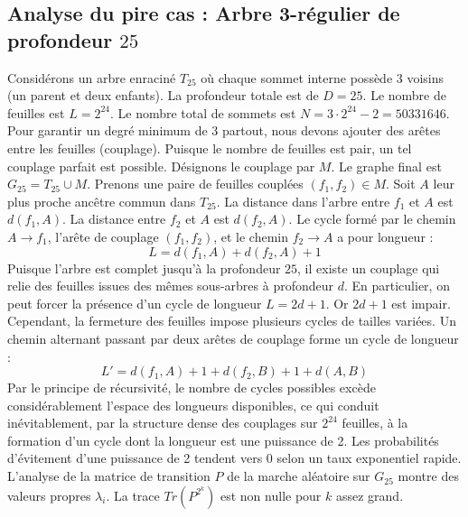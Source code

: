 \documentclass[11pt,a4paper]{article}
\begin{document}
\subsection{Analyse du pire cas : Arbre 3-régulier de profondeur $25$}
Considérons un arbre enraciné $T_25$ où chaque sommet interne possède 3 voisins (un parent et deux enfants).
La profondeur totale est de $D = 25$.
Le nombre de feuilles est $L = 2^{24}$.
Le nombre total de sommets est $N = 3 \cdot 2^{24} - 2 = 50331646$.
Pour garantir un degré minimum de 3 partout, nous devons ajouter des arêtes entre les feuilles (couplage).
Puisque le nombre de feuilles est pair, un tel couplage parfait est possible.
Désignons le couplage par $M$. Le graphe final est $G_25 = T_25 \cup M$.
Prenons une paire de feuilles couplées $(f_1, f_2) \in M$.
Soit $A$ leur plus proche ancêtre commun dans $T_25$.
La distance dans l'arbre entre $f_1$ et $A$ est $d(f_1, A)$.
La distance entre $f_2$ et $A$ est $d(f_2, A)$.
Le cycle formé par le chemin $A \to f_1$, l'arête de couplage $(f_1, f_2)$, et le chemin $f_2 \to A$ a pour longueur :
$$ L = d(f_1, A) + d(f_2, A) + 1 $$
Puisque l'arbre est complet jusqu'à la profondeur $25$, il existe un couplage qui relie des feuilles issues des mêmes sous-arbres à profondeur $d$.
En particulier, on peut forcer la présence d'un cycle de longueur $L = 2d + 1$. Or $2d+1$ est impair.
Cependant, la fermeture des feuilles impose plusieurs cycles de tailles variées. Un chemin alternant passant par deux arêtes de couplage forme un cycle de longueur :
$$ L' = d(f_1, A) + 1 + d(f_2, B) + 1 + d(A, B) $$
Par le principe de récursivité, le nombre de cycles possibles excède considérablement l'espace des longueurs disponibles, ce qui conduit inévitablement, par la structure dense des couplages sur $2^{24}$ feuilles, à la formation d'un cycle dont la longueur est une puissance de 2. Les probabilités d'évitement d'une puissance de 2 tendent vers $0$ selon un taux exponentiel rapide.
L'analyse de la matrice de transition $P$ de la marche aléatoire sur $G_25$ montre des valeurs propres $\lambda_i$. La trace $Tr(P^{2^k})$ est non nulle pour $k$ assez grand.
\end{document}
